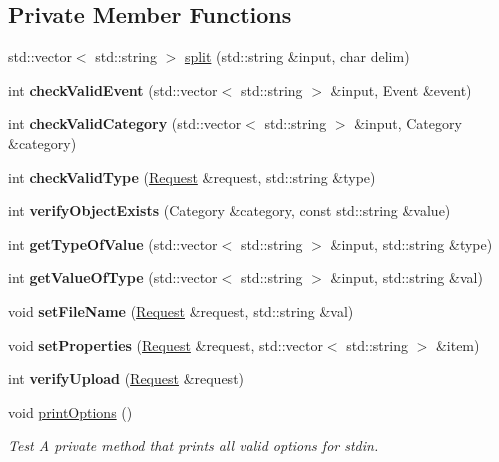 \subsection*{Private Member Functions}
\begin{DoxyCompactItemize}
\item 
std\+::vector$<$ std\+::string $>$ \hyperlink{classCli_aaf60768f062a6dc2557aaddbe738a19c}{split} (std\+::string \&input, char delim)
\item 
\mbox{\label{classCli_a8b6ecb803833139fc7dbdb1bac9cb127}} 
int {\bfseries check\+Valid\+Event} (std\+::vector$<$ std\+::string $>$ \&input, Event \&event)
\item 
\mbox{\label{classCli_a116a3c89cbb5f9b807661123ee0dd5a3}} 
int {\bfseries check\+Valid\+Category} (std\+::vector$<$ std\+::string $>$ \&input, Category \&category)
\item 
\mbox{\label{classCli_a5137618fd0eeaa34964b175aff8061ef}} 
int {\bfseries check\+Valid\+Type} (\hyperlink{classRequest}{Request} \&request, std\+::string \&type)
\item 
\mbox{\label{classCli_af10df67ce26c8a773e573323c47d9781}} 
int {\bfseries verify\+Object\+Exists} (Category \&category, const std\+::string \&value)
\item 
\mbox{\label{classCli_a6121ca606d1ae7b8b8b57d31786d2e18}} 
int {\bfseries get\+Type\+Of\+Value} (std\+::vector$<$ std\+::string $>$ \&input, std\+::string \&type)
\item 
\mbox{\label{classCli_ac00196cbc1bd9683127923b13de9cbbc}} 
int {\bfseries get\+Value\+Of\+Type} (std\+::vector$<$ std\+::string $>$ \&input, std\+::string \&val)
\item 
\mbox{\label{classCli_a2e2d57f7175aa6423db2a616098a3b2e}} 
void {\bfseries set\+File\+Name} (\hyperlink{classRequest}{Request} \&request, std\+::string \&val)
\item 
\mbox{\label{classCli_a0cf3263bf644c151d59b8957746a9507}} 
void {\bfseries set\+Properties} (\hyperlink{classRequest}{Request} \&request, std\+::vector$<$ std\+::string $>$ \&item)
\item 
\mbox{\label{classCli_ae51022f0ca5e385ebd2551021f653b97}} 
int {\bfseries verify\+Upload} (\hyperlink{classRequest}{Request} \&request)
\item 
void \hyperlink{classCli_a8251d6c89698aaf128318fc3ad4b2906}{print\+Options} ()
\begin{DoxyCompactList}\small\item\em Test A private method that prints all valid options for stdin. \end{DoxyCompactList}\end{DoxyCompactItemize}
